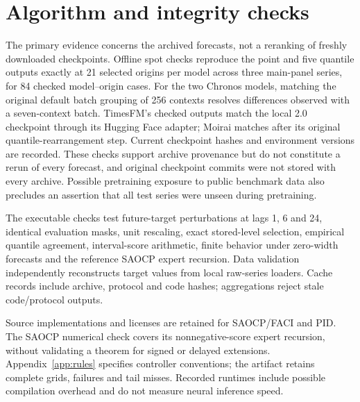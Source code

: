 \documentclass[preprint,11pt]{elsarticle}
\begin{document}
\begin{table}[h!]\centering\scriptsize
\caption{Unified comparison on the revisited panel at $h=24$. IS ratio averages
per-pair interval scores divided by that pair's residual rolling-quantile score;
lower is better. Family coverage is percent (target 90\%). Local is the family-balanced
150-origin absolute coverage error in percentage points; Singleton is percent.
Original rows retain locked-grid results, wide ACI and multi-step PID are subsequent
sensitivities. PI-log and SF-OGD retain fixed defaults, not tuned optima.}

\end{table}

\clearpage
\section{Algorithm and integrity checks}\label{app:integrity}
The primary evidence concerns the archived forecasts, not a reranking of freshly
downloaded checkpoints. Offline spot checks reproduce the point and five quantile outputs
exactly at 21 selected origins per model across three main-panel series, for 84 checked
model--origin cases. For the two Chronos models, matching the original default batch
grouping of 256 contexts resolves differences observed with a seven-context batch.
TimesFM's checked outputs match the local 2.0 checkpoint through its Hugging Face adapter;
Moirai matches after its original quantile-rearrangement step. Current checkpoint hashes
and environment versions are recorded. These checks support archive provenance but
do not constitute a rerun of every forecast, and original checkpoint commits were not
stored with every archive. Possible pretraining exposure to
public benchmark data also precludes an assertion that all test series were unseen during
pretraining.


The executable checks test future-target perturbations at lags 1, 6 and 24, identical
evaluation masks, unit rescaling, exact stored-level selection, empirical quantile
agreement, interval-score arithmetic, finite behavior under zero-width forecasts and
the reference SAOCP expert recursion. Data validation independently reconstructs target
values from local raw-series loaders. Cache records include archive, protocol and code
hashes; aggregations reject stale code/protocol outputs.

Source implementations and licenses are retained for SAOCP/FACI and PID. The SAOCP
numerical check covers its nonnegative-score expert recursion, without validating a
theorem for signed or delayed extensions. Appendix~\ref{app:rules} specifies controller
conventions; the artifact retains complete grids, failures and tail misses. Recorded
runtimes include possible compilation overhead and do not measure neural inference speed.
\end{document}
